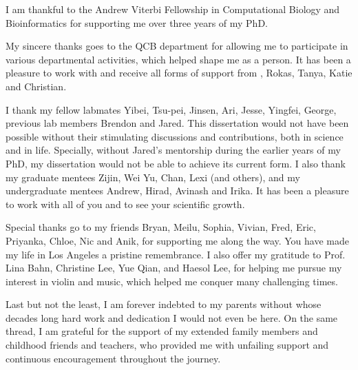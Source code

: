 I am thankful to the Andrew Viterbi Fellowship in Computational Biology and Bioinformatics for supporting me over three years of my PhD.

My sincere thanks goes to the QCB department for allowing me to participate in various departmental activities, which helped shape me as a person. It has been a pleasure to work with and receive all forms of support from , Rokas, Tanya, Katie and Christian.

I thank my fellow labmates Yibei, Tsu-pei, Jinsen, Ari, Jesse, Yingfei, George, previous lab members Brendon and Jared. This dissertation would not have been possible without their stimulating discussions and contributions, both in science and in life. Specially, without Jared's mentorship during the earlier years of my PhD, my dissertation would not be able to achieve its current form. I also thank my graduate mentees Zijin, Wei Yu, Chan, Lexi (and others), and my undergraduate mentees Andrew, Hirad, Avinash and Irika. It has been a pleasure to work with all of you and to see your scientific growth. 

Special thanks go to my friends Bryan, Meilu, Sophia, Vivian, Fred, Eric, Priyanka, Chloe, Nic and Anik, for supporting me along the way. You have made my life in Los Angeles a pristine remembrance. I also offer my gratitude to Prof. Lina Bahn, Christine Lee, Yue Qian, and Haesol Lee, for helping me pursue my interest in violin and music, which helped me conquer many challenging times.

Last but not the least, I am forever indebted to my parents without whose decades long hard work and dedication I would not even be here. On the same thread, I am grateful for the support of my extended family members and childhood friends and teachers, who provided me with unfailing support and continuous encouragement throughout the journey.